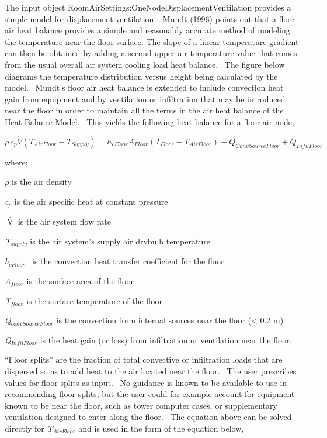 {The input object RoomAirSettings:OneNodeDisplacementVentilation provides a simple model for displacement ventilation.~ Mundt (1996) points out that a floor air heat balance provides a simple and reasonably accurate method of modeling the temperature near the floor surface. The slope of a linear temperature gradient can then be obtained by adding a second upper air temperature value that comes from the usual overall air system cooling load heat balance.~ The figure below diagrams the temperature distribution versus height being calculated by the model.~ Mundt's floor air heat balance is extended to include convection heat gain from equipment and by ventilation or infiltration that may be introduced near the floor in order to maintain all the terms in the air heat balance of the Heat Balance Model.~ This yields the following heat balance for a floor air node,

\begin{equation}
\rho \,{c_p}\dot V({T_{AirFloor}} - {T_{Supply}}) = {h_{cFloor}}{A_{Floor}}({T_{Floor}} - {T_{AirFloor}}) + {Q_{ConvSourceFloor}} + {Q_{InfilFloor}}
\end{equation}

where:

\emph{\(\rho\)} is the air density

\emph{c\(_{p}\)} is the air specific heat at constant pressure

\(\mathop V\limits^\cdot\) is the air system flow rate

\emph{T\(_{supply}\)} is the air system's supply air drybulb temperature

\emph{h\(_{cFloor}\)} ~is the convection heat transfer coefficient for the floor

\emph{A\(_{floor}\)} is the surface area of the floor

\emph{T\(_{floor}\)} is the surface temperature of the floor

\emph{Q\(_{convSourceFloor}\)} is the convection from internal sources near the floor (\textless{} 0.2 m)

\emph{Q\(_{InfilFloor}\)} is the heat gain (or loss) from infiltration or ventilation near the floor.

``Floor splits'' are the fraction of total convective or infiltration loads that are dispersed so as to add heat to the air located near the floor.~ The user prescribes values for floor splits as input.~ No guidance is known to be available to use in recommending floor splits, but the user could for example account for equipment known to be near the floor, such as tower computer cases, or supplementary ventilation designed to enter along the floor.~ The equation above can be solved directly for \emph{T\(_{AirFloor}\)} and is used in the form of the equation below,

}
